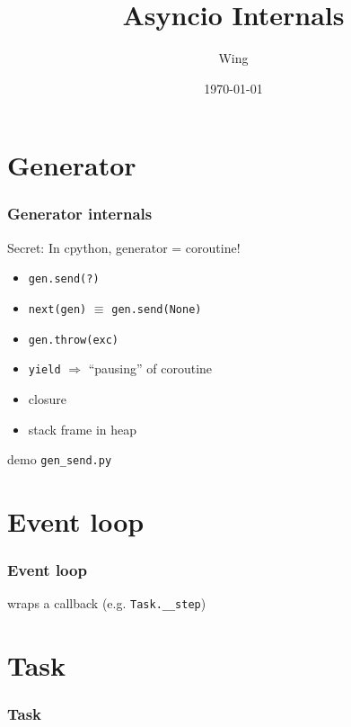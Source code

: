 \documentclass[compress,usenames,dvipsnames]{beamer}
\author{Wing}
\title{Asyncio Internals}
\begin{document}
\date{\today} 

\frame[plain]{\titlepage} %

\section{Generator}
\begin{frame}[plain]
    \frametitle{Generator internals}
    Secret: In cpython, generator = coroutine!
    \begin{itemize}
        \item {\lstinline{gen.send(?)}}
        \item {\lstinline{next(gen)}} $\equiv$ {\lstinline{gen.send(None)}}
        \item {\lstinline{gen.throw(exc)}}
        \item {\lstinline{yield}} $\Rightarrow$ ``pausing'' of coroutine
        \item closure
        \item stack frame in heap

    \end{itemize}
    demo {\lstinline{gen_send.py}}
\end{frame}

\section{Event loop}

\begin{frame}
    \frametitle{Event loop}
    \begin{center}
    \begin{adjustbox}{}
         
    \end{adjustbox}
    \end{center}
    {} wraps a callback (e.g. \verb|Task.__step|)
\end{frame}

\section{Task}

\begin{frame}[plain, t]
    \frametitle{Task}
    \begin{center}
    \begin{adjustbox}{margin=10pt}
             
    \end{adjustbox}
    \end{center}
\end{frame}
\end{document}
